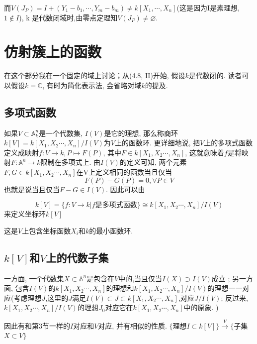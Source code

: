 \documentclass[UTF8]{book}
\begin{document}
	而$V(J_{P})=I+(Y_{1}-b_{1}, \cdots , Y_{m}-b_{m})\neq k[X_{1}, \cdots , X_{n}]$(这是因为I是素理想,$1\notin I$), k 是代数闭域时,由零点定理知$V(J_{P})\neq \varnothing$.
	

			
		
		
\chapter{仿射簇上的函数}
	\indent 在这个部分我在一个固定的域上讨论；从(4.8, II)开始, 假设$ k $是代数闭的. 读者可以假设$ k=\mathbb{C} $, 有时为简化表示法, 会省略对域$ k $的提及.

		\section{多项式函数} 如果$V\subset \mathbb{A}^{n}_{k}$是一个代数集, $ I(V) $是它的理想, 那么称商环$k[V]=k[X_{1},X_{2}\cdots,X_{n}]/I(V)$为$ V $上的函数环. 更详细地说, 把$ V $上的多项式函数定义成映射$f:V\rightarrow k, P\mapsto F(P)$, 其中$F\in k[X_{1},X_{2}\cdots,X_{n}]$, 这就意味着$ f $是将映射$F:\mathbb{A}^{n}\rightarrow k$限制在多项式上. 由$ I(V) $的定义可知, 两个元素$F,G\in k[X_{1},X_{2}\cdots,X_{n}]$在V上定义相同的函数当且仅当
		\begin{equation*}
		F(P)-G(P)=0, \forall  P\in V
		\end{equation*}
		也就是说当且仅当$F-G\in I(V)$. 因此可以由

		 \begin{equation*}k[V]=\{f: V  \rightarrow  k\vert f \text{是多项式函数}\} \cong  k[X_{1},X_{2}\cdots,X_{n}]/I(V)\end{equation*}		
		来定义坐标环$ k[V] $

		这是$ V $上包含坐标函数$X_{i}$和$ k $的最小函数环.


	\section{$ k[V] $和$ V $上的代数子集} 一方面, 一个代数集$X\subset  \mathbb{A}^{n}$是包含在$ V $中的,当且仅当$ I(X) \supset I(V) $成立 ; 另一方面, 包含$ I(V) $的$k[X_{1},X_{2}\cdots,X_{n}]$的理想和$ k[X_{1},X_{2}\cdots,X_{n}]/I(V)$的理想一一对应(考虑理想$ J $,这里的$ J $满足$I(V) \subset J \subset k[X_{1},X_{2}\cdots,X_{n}]$,对应$ J/I(V) $; 反过来,$k[X_{1},X_{2}\cdots,X_{n}]/I(V)$的理想$J_{0}$对应它在$k[X_{1},X_{2}\cdots,X_{n}]$中的原象. )

		因此有和第3节一样的$ I $对应和$ V $对应, 并有相似的性质.
			   \center  $\{$理想$I\subset k[V]\}\stackrel{V}{\longrightarrow} \{$子集$X\subset V \}$
\end{document}
